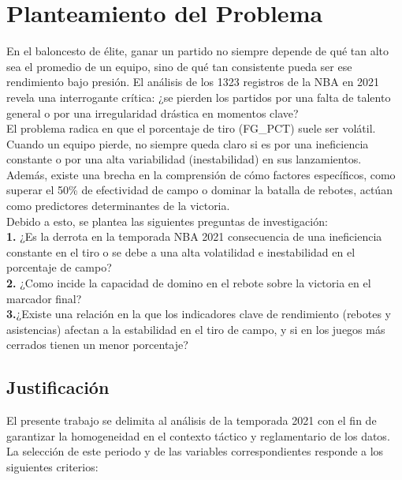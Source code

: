 \documentclass[oneside,11pt]{Latex/Classes/PhDthesisPSnPDF}
\begin{document}
\chapter{Planteamiento del Problema}

En el baloncesto de élite, ganar un partido no siempre depende de qué
tan alto sea el promedio de un equipo, sino de qué tan consistente pueda
ser ese rendimiento bajo presión. El análisis de los 1323 registros de
la NBA en 2021 revela una interrogante crítica: ¿se pierden los partidos
por una falta de talento general o por una irregularidad drástica en
momentos clave?\\

El problema radica en que el porcentaje de tiro (FG\_PCT) suele ser
volátil. Cuando un equipo pierde, no siempre queda claro si es por una
ineficiencia constante o por una alta variabilidad (inestabilidad) en
sus lanzamientos. Además, existe una brecha en la comprensión de cómo
factores específicos, como superar el 50\% de efectividad de campo o
dominar la batalla de rebotes, actúan como predictores determinantes de
la victoria.\\

Debido a esto, se plantea las siguientes preguntas de investigación:\\

\textbf{1.} ¿Es la derrota en la temporada NBA 2021 consecuencia de una
ineficiencia constante en el tiro o se debe a una alta volatilidad e
inestabilidad en el porcentaje de campo?\\

\textbf{2.} ¿Como incide la capacidad de domino en el rebote sobre la
victoria en el marcador final?\\

\textbf{3.}¿Existe una relación en la que los indicadores clave de
rendimiento (rebotes y asistencias) afectan a la estabilidad en el tiro
de campo, y si en los juegos más cerrados tienen un menor porcentaje?\\

\section{Justificación}

El presente trabajo se delimita al análisis de la temporada 2021 con el
fin de garantizar la homogeneidad en el contexto táctico y reglamentario
de los datos. La selección de este periodo y de las variables
correspondientes responde a los siguientes criterios:\\
\end{document}
